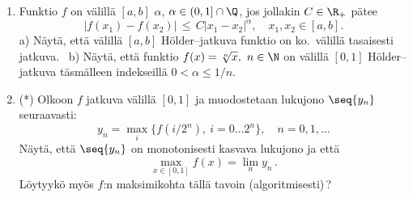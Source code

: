 \begin{enumerate}
\item {}
Funktio $f$ on välillä $[a,b]$  $\alpha$,
$\alpha\in(0,1]\cap\Q$, jos jollakin $C\in\R_+$ pätee
\[
|f(x_1)-f(x_2)| \,\le\, C|x_1-x_2|^\alpha, \quad x_1,x_2\in[a,b].
\]
a) Näytä, että välillä $[a,b]$ Hölder--jatkuva funktio
on ko.\ välillä tasaisesti jatkuva. \ b) Näytä, että funktio $f(x)=\sqrt[n]{x},\ n\in\N$ on
välillä $[0,1]$ Hölder--jatkuva täsmälleen indekseillä $0 < \alpha \le 1/n$.

\item (*)
Olkoon $f$ jatkuva välillä $[0,1]$ ja muodostetaan lukujono $\seq{y_n}$ seuraavasti:
\[
y_n = \max_i\{f(i/2^n),\ i=0 \ldots 2^n\}, \quad n=0,1,\ldots
\]
Näytä, että $\seq{y_n}$ on monotonisesti kasvava lukujono ja että
\[
\max_{x\in[0,1]}f(x)=\lim_n y_n\,.
\]
Löytyykö myös $f$:n maksimikohta tällä tavoin (algoritmisesti)\,?

\end{enumerate}